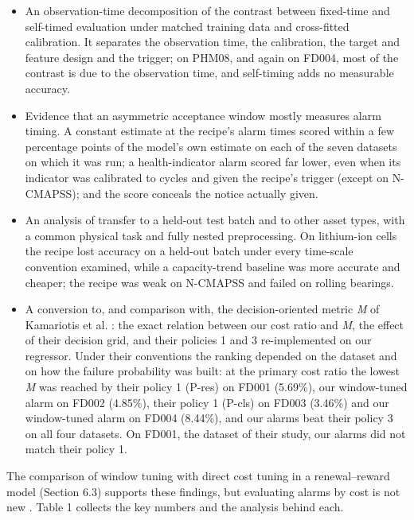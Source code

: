 \documentclass[a4paper,fleqn,doubleblind]{cas-dc}
\begin{document}
\begin{itemize}[leftmargin=1.2em,itemsep=2pt]
\item[(i)] An observation-time decomposition of the contrast between fixed-time and self-timed evaluation under matched training data and cross-fitted calibration. It separates the observation time, the calibration, the target and feature design and the trigger; on PHM08, and again on FD004, most of the contrast is due to the observation time, and self-timing adds no measurable accuracy.
\item[(ii)] Evidence that an asymmetric acceptance window mostly measures alarm timing. A constant estimate at the recipe's alarm times scored within a few percentage points of the model's own estimate on each of the seven datasets on which it was run; a health-indicator alarm scored far lower, even when its indicator was calibrated to cycles and given the recipe's trigger (except on N-CMAPSS); and the score conceals the notice actually given.
\item[(iii)] An analysis of transfer to a held-out test batch and to other asset types, with a common physical task and fully nested preprocessing. On lithium-ion cells the recipe lost accuracy on a held-out batch under every time-scale convention examined, while a capacity-trend baseline was more accurate and cheaper; the recipe was weak on N-CMAPSS and failed on rolling bearings.
\item[(iv)] A conversion to, and comparison with, the decision-oriented metric \textit{M} of Kamariotis et al. \cite{kamariotis2024}: the exact relation between our cost ratio and \textit{M}, the effect of their decision grid, and their policies 1 and 3 re-implemented on our regressor. Under their conventions the ranking depended on the dataset and on how the failure probability was built: at the primary cost ratio the lowest \textit{M} was reached by their policy 1 (P-res) on FD001 (5.69\%), our window-tuned alarm on FD002 (4.85\%), their policy 1 (P-cls) on FD003 (3.46\%) and our window-tuned alarm on FD004 (8.44\%), and our alarms beat their policy 3 on all four datasets. On FD001, the dataset of their study, our alarms did not match their policy 1.
\end{itemize}

The comparison of window tuning with direct cost tuning in a renewal--reward model (Section 6.3) supports these findings, but evaluating alarms by cost is not new \cite{depater2022,kamariotis2024}. Table 1 collects the key numbers and the analysis behind each.
\end{document}
